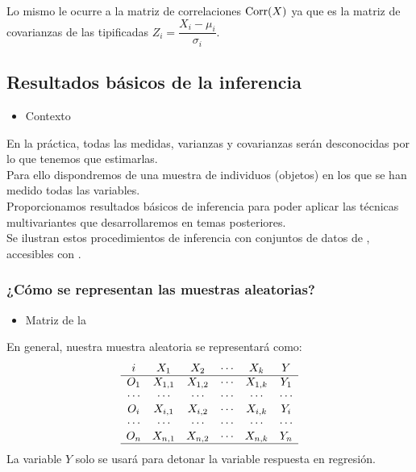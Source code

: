Lo mismo le ocurre a la matriz de correlaciones $\operatorname{Corr}(X)$ ya que es la matriz de covarianzas de las \vas tipificadas $Z_i=\dfrac{X_i-\mu_i}{\sigma_i}$.
\subsection{Resultados básicos de la inferencia}
\begin{itemize}[label=\color{red}\textbullet, leftmargin=*]
	\item \color{lightblue}Contexto
\end{itemize}
En la práctica, todas las medidas, varianzas y covarianzas serán desconocidas por lo que tenemos que estimarlas.\\
Para ello dispondremos de una muestra de individuos (objetos) en los que se han medido todas las variables.\\
Proporcionamos resultados básicos de inferencia para poder aplicar las técnicas multivariantes que desarrollaremos en temas posteriores.\\
Se ilustran estos procedimientos de inferencia con conjuntos de datos de , accesibles con .
\subsubsection{¿Cómo se representan las muestras aleatorias?}

\begin{figure}
\end{figure}

\begin{itemize}[label=\color{red}\textbullet, leftmargin=*]
	\item \color{lightblue}Matriz de la \mas
\end{itemize}

En general, nuestra muestra aleatoria se representará como:
\[ \begin{array}{cccccc}
i & X_1 & X_2 & \cdots & X_k & Y \\ \hline
O_1 & X_{1,1} & X_{1,2} & \cdots & X_{1,k} & Y_1 \\
\cdots & \cdots & \cdots & \cdots & \cdots & \cdots \\
O_i & X_{i,1} & X_{i,2} & \cdots & X_{i,k} & Y_i \\
\cdots & \cdots & \cdots & \cdots & \cdots & \cdots \\
O_n & X_{n,1} & X_{n,2} & \cdots & X_{n,k} & Y_n \\ \hline
\end{array} \]
La variable $Y$ solo se usará para detonar la variable respuesta en regresión.

